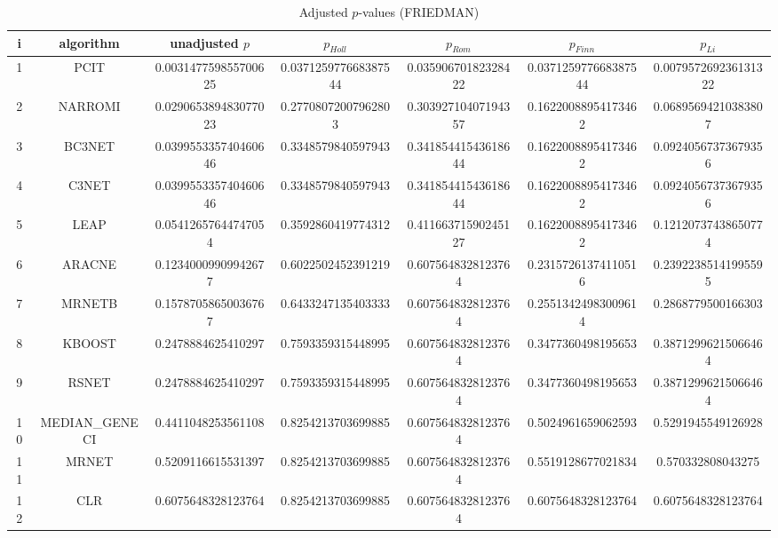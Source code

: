 \documentclass[a4paper,10pt]{article}
\begin{document}
\begin{landscape}
\begin{table}[!htp]
\centering\scriptsize
\caption{Adjusted $p$-values (FRIEDMAN)}
\begin{tabular}{ccccccc}
i&algorithm&unadjusted $p$&$p_{Holl}$&$p_{Rom}$&$p_{Finn}$&$p_{Li}$\\
\hline
1&PCIT&0.003147759855700625&0.037125977668387544&0.03590670182328422&0.037125977668387544&0.007957269236131322\\
2&NARROMI&0.029065389483077023&0.27708072007962803&0.30392710407194357&0.16220088954173462&0.06895694210383807\\
3&BC3NET&0.039955335740460646&0.3348579840597943&0.34185441543618644&0.16220088954173462&0.09240567373679356\\
4&C3NET&0.039955335740460646&0.3348579840597943&0.34185441543618644&0.16220088954173462&0.09240567373679356\\
5&LEAP&0.05412657644747054&0.3592860419774312&0.41166371590245127&0.16220088954173462&0.12120737438650774\\
6&ARACNE&0.12340009909942677&0.6022502452391219&0.6075648328123764&0.23157261374110516&0.23922385141995595\\
7&MRNETB&0.15787058650036767&0.6433247135403333&0.6075648328123764&0.25513424983009614&0.2868779500166303\\
8&KBOOST&0.2478884625410297&0.7593359315448995&0.6075648328123764&0.3477360498195653&0.38712996215066464\\
9&RSNET&0.2478884625410297&0.7593359315448995&0.6075648328123764&0.3477360498195653&0.38712996215066464\\
10&MEDIAN_GENECI&0.4411048253561108&0.8254213703699885&0.6075648328123764&0.5024961659062593&0.5291945549126928\\
11&MRNET&0.5209116615531397&0.8254213703699885&0.6075648328123764&0.5519128677021834&0.570332808043275\\
12&CLR&0.6075648328123764&0.8254213703699885&0.6075648328123764&0.6075648328123764&0.6075648328123764\\
\hline
\end{tabular}
\end{table}


\newpage


\end{landscape}
\end{document}
